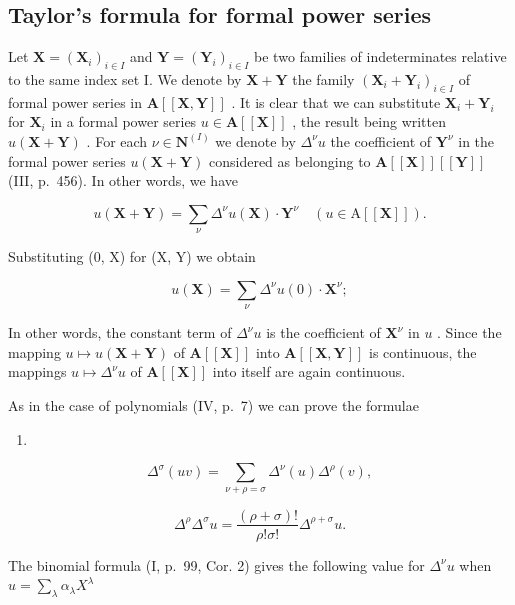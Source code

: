 \subsection{Taylor's formula for formal power series}

Let \(\mathbf{X} = (\mathbf{X}_i)_{i\in I}\) and \(\mathbf{Y} = (\mathbf{Y}_i)_{i\in I}\) be two families of indeterminates relative to the same index set I. We denote by \(\mathbf{X} + \mathbf{Y}\) the family \((\mathbf{X}_i + \mathbf{Y}_i)_{i\in I}\) of formal power series in \(\mathbf{A}[[\mathbf{X},\mathbf{Y}]]\) . It is clear that we can substitute \(\mathbf{X}_i + \mathbf{Y}_i\) for \(\mathbf{X}_i\) in a formal power series \(u\in \mathbf{A}[[\mathbf{X}]]\) , the result being written \(u(\mathbf{X} + \mathbf{Y})\) . For each \(\nu \in \mathbf{N}^{(I)}\) we denote by \(\Delta^{\nu}u\) the coefficient of \(\mathbf{Y}^{\nu}\) in the formal power series \(u(\mathbf{X} + \mathbf{Y})\) considered as belonging to \(\mathbf{A}[[\mathbf{X}]][[\mathbf{Y}]]\) (III, p.~456). In other words, we have

\[
u (\mathbf {X} + \mathbf {Y}) = \sum_ {\nu} \Delta^ {\nu} u (\mathbf {X}) \cdot \mathbf {Y} ^ {\nu} \quad (u \in \mathrm{A} [ [ \mathbf {X} ] ]).\tag{6}
\]

Substituting (0, X) for (X, Y) we obtain

\[
u (\mathbf {X}) = \sum_ {\nu} \Delta^ {\nu} u (0) \cdot \mathbf {X} ^ {\nu};\tag{7}
\]

In other words, the constant term of \(\Delta^{\nu}u\) is the coefficient of \(\mathbf{X}^{\nu}\) in \(u\) . Since the mapping \(u \mapsto u(\mathbf{X} + \mathbf{Y})\) of \(\mathbf{A}[[\mathbf{X}]]\) into \(\mathbf{A}[[\mathbf{X}, \mathbf{Y}]]\) is continuous, the mappings \(u \mapsto \Delta^{\nu}u\) of \(\mathbf{A}[[\mathbf{X}]]\) into itself are again continuous.

As in the case of polynomials (IV, p.~7) we can prove the formulae

\begin{enumerate}
\def\labelenumi{(\arabic{enumi})}
\setcounter{enumi}{7}
\tightlist
\item
\end{enumerate}

\[
\Delta^ {\sigma} (u v) = \sum_ {\nu + \rho = \sigma} \Delta^ {\nu} (u) \Delta^ {\rho} (v),
\]

\[
\Delta^ {\rho} \Delta^ {\sigma} u = \frac {(\rho + \sigma) !}{\rho ! \sigma !} \Delta^ {\rho + \sigma} u.\tag{9}
\]

The binomial formula (I, p.~99, Cor. 2) gives the following value for \(\Delta^{\nu}u\) when \(u = \sum_{\lambda} \alpha_{\lambda} X^{\lambda}\)

